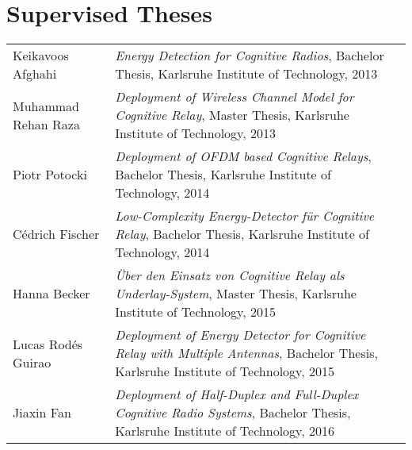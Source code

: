 \chapter*{Supervised Theses}

\begin{tabular*}{\textwidth}[]{p{3.5cm} p{7cm}}
\rule{0pt}{3ex}
	Keikavoos Afghahi & \emph{Energy Detection for Cognitive Radios}, Bachelor Thesis, Karlsruhe Institute of Technology, 2013\\
\rule{0pt}{3ex}
Muhammad Rehan Raza & \emph{Deployment of Wireless Channel Model for Cognitive Relay}, Master Thesis, Karlsruhe Institute of Technology, 2013\\
\rule{0pt}{3ex}
	Piotr Potocki & \emph{Deployment of OFDM based Cognitive Relays}, Bachelor Thesis, Karlsruhe Institute of Technology, 2014\\ 
\rule{0pt}{3ex}
	C\'{e}drich Fischer & \emph{Low-Complexity Energy-Detector f\"ur Cognitive Relay}, Bachelor Thesis, Karlsruhe Institute of Technology, 2014\\ 
\rule{0pt}{3ex}
	Hanna Becker & \emph{\"Uber den Einsatz von Cognitive Relay als Underlay-System}, Master Thesis, Karlsruhe Institute of Technology, 2015\\ 
\rule{0pt}{3ex}
	Lucas Rod\'{e}s Guirao & \emph{Deployment of Energy Detector for Cognitive Relay with Multiple Antennas},  Bachelor Thesis, Karlsruhe Institute of Technology, 2015\\ 
\rule{0pt}{3ex}
	Jiaxin Fan & \emph{Deployment of Half-Duplex and Full-Duplex Cognitive Radio Systems},  Bachelor Thesis, Karlsruhe Institute of Technology, 2016\\ 

\end{tabular*}

